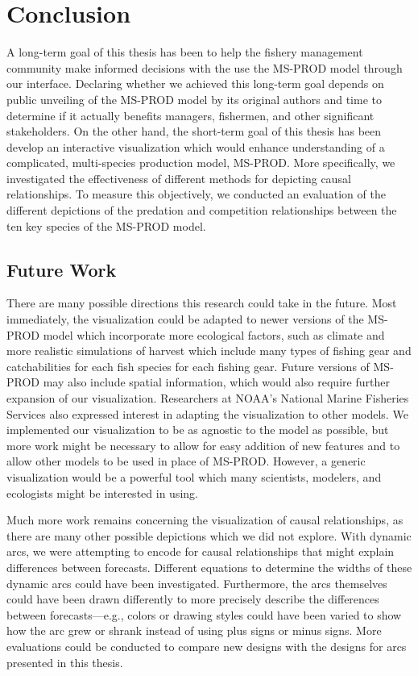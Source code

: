 \chapter{Conclusion}

A long-term goal of this thesis has been to help the fishery management community make informed decisions with the use the MS-PROD model through our interface.  Declaring whether we achieved this long-term goal depends on public unveiling of the MS-PROD model by its original authors and time to determine if it actually benefits managers, fishermen, and other significant stakeholders.  On the other hand, the short-term goal of this thesis has been develop an interactive visualization which would enhance understanding of a complicated, multi-species production model, MS-PROD.  More specifically, we investigated the effectiveness of different methods for depicting causal relationships.  To measure this objectively, we conducted an evaluation of the different depictions of the predation and competition relationships between the ten key species of the MS-PROD model.

\section{Future Work}

There are many possible directions this research could take in the future.  Most immediately, the visualization could be adapted to newer versions of the MS-PROD model which incorporate more ecological factors, such as climate and more realistic simulations of harvest which include many types of fishing gear and catchabilities for each fish species for each fishing gear.  Future versions of MS-PROD may also include spatial information, which would also require further expansion of our visualization.  Researchers at NOAA's National Marine Fisheries Services also expressed interest in adapting the visualization to other models.  We implemented our visualization to be as agnostic to the model as possible, but more work might be necessary to allow for easy addition of new features and to allow other models to be used in place of MS-PROD.  However, a generic visualization would be a powerful tool which many scientists, modelers, and ecologists might be interested in using.

Much more work remains concerning the visualization of causal relationships, as there are many other possible depictions which we did not explore.  With dynamic arcs, we were attempting to encode for causal relationships that might explain differences between forecasts.  Different equations to determine the widths of these dynamic arcs could have been investigated.  Furthermore, the arcs themselves could have been drawn differently to more precisely describe the differences between forecasts---e.g., colors or drawing styles could have been varied to show how the arc grew or shrank instead of using plus signs or minus signs.  More evaluations could be conducted to compare new designs with the designs for arcs presented in this thesis.


